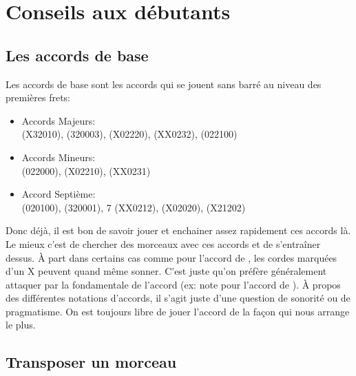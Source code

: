 \documentclass[versionenligne]{framabook}
\begin{document}
\section{Conseils aux débutants}

\subsection{Les accords de base}

Les accords de base sont les accords qui se jouent sans barré au
niveau des premières frets:

\begin{itemize}
\item Accords Majeurs:\\  (X32010), 
  (320003),  (X02220),  (XX0232), 
  (022100)\\
\item Accords Mineurs:\\
   (022000),  (X02210),  (XX0231)\\
\item Accord Septième:\\  (020100), 
  (320001), 7 (XX0212),  (X02020),
   (X21202)\\
\end{itemize}

Donc déjà, il est bon de savoir jouer et enchainer assez rapidement
ces accords là. Le mieux c'est de chercher des morceaux avec ces
accords et de s'entraîner dessus.  À part dans certains cas comme pour
l'accord de , les cordes marquées d'un X peuvent quand
même sonner.  C'est juste qu'on préfère généralement attaquer par la
fondamentale de l'accord (ex: note  pour l'accord de
).  À propos des différentes notations d'accords,
il s'agit juste d'une question de sonorité ou de pragmatisme. On est
toujours libre de jouer l'accord de la façon qui nous arrange le plus.

\subsection{Transposer un morceau}
\end{document}
